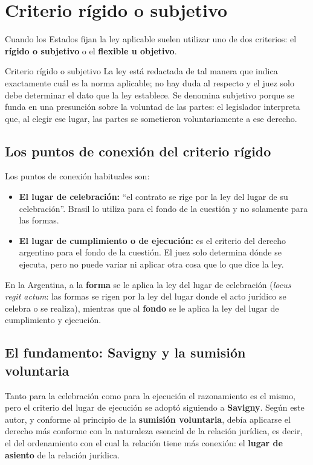 \documentclass[12pt,oneside]{book}
\begin{document}
\section{Criterio rígido o subjetivo}

Cuando los Estados fijan la ley aplicable suelen utilizar uno de dos criterios: el \textbf{rígido o subjetivo} o el \textbf{flexible u objetivo}.

\begin{definition}{Criterio rígido o subjetivo}
La ley está redactada de tal manera que indica exactamente cuál es la norma aplicable; no hay duda al respecto y el juez solo debe determinar el dato que la ley establece. Se denomina subjetivo porque se funda en una presunción sobre la voluntad de las partes: el legislador interpreta que, al elegir ese lugar, las partes se sometieron voluntariamente a ese derecho.
\end{definition}

\subsection{Los puntos de conexión del criterio rígido}

Los puntos de conexión habituales son:

\begin{itemize}
    \item \textbf{El lugar de celebración:} ``el contrato se rige por la ley del lugar de su celebración''. Brasil lo utiliza para el fondo de la cuestión y no solamente para las formas.
    \item \textbf{El lugar de cumplimiento o de ejecución:} es el criterio del derecho argentino para el fondo de la cuestión. El juez solo determina dónde se ejecuta, pero no puede variar ni aplicar otra cosa que lo que dice la ley.
\end{itemize}

En la Argentina, a la \textbf{forma} se le aplica la ley del lugar de celebración (\textit{locus regit actum}: las formas se rigen por la ley del lugar donde el acto jurídico se celebra o se realiza), mientras que al \textbf{fondo} se le aplica la ley del lugar de cumplimiento y ejecución.

\subsection{El fundamento: Savigny y la sumisión voluntaria}

Tanto para la celebración como para la ejecución el razonamiento es el mismo, pero el criterio del lugar de ejecución se adoptó siguiendo a \textbf{Savigny}. Según este autor, y conforme al principio de la \textbf{sumisión voluntaria}, debía aplicarse el derecho más conforme con la naturaleza esencial de la relación jurídica, es decir, el del ordenamiento con el cual la relación tiene más conexión: el \textbf{lugar de asiento} de la relación jurídica.
\end{document}
